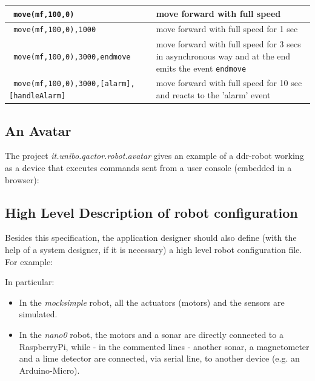 \medskip 
\noindent
\begin{footnotesize}
\begin{tabular}{|p{}|p{}|}
\hline 
\texttt{ move(mf,100,0) } & move forward with full speed   \\ 
\hline 
\texttt{ move(mf,100,0),1000 } & move forward with full speed for 1 sec  \\ 
\hline 
\texttt{ move(mf,100,0),3000,endmove } & move forward with full speed for 3 secs in asynchronous way and at the end emits the event \texttt{endmove} \\
\hline 
\texttt{ move(mf,100,0),3000,[alarm],[handleAlarm] } & move forward with full speed for 10 sec and reacts to the 'alarm' event \\ 
\hline 
\end{tabular} 
\end{footnotesize}

\subsection{An Avatar}

The project \textit{it.unibo.qactor.robot.avatar}  gives an example of a ddr-robot working as a device that executes commands sent from a user console (embedded in a browser):



\subsection{High Level Description of robot configuration }

Besides this specification, the application designer should also define (with the help of a system designer, if it is necessary) a high level robot configuration file. For example:






In particular:

\begin{itemize}
\item In the \textit{mocksimple} robot, all the actuators (motors) and the sensors are simulated.
\item In the \textit{nano0} robot, the motors and a sonar are directly connected to a RaspberryPi, while - in the commented lines - another sonar, a magnetometer and a lime detector are  connected, via serial line, to another device (e.g. an Arduino-Micro).
\end{itemize}

